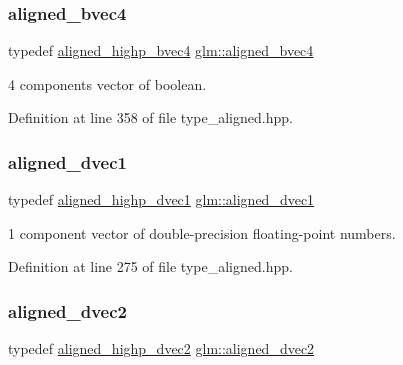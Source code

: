 \subsubsection{\texorpdfstring{aligned\_bvec4}{aligned\_bvec4}}
{\footnotesize\ttfamily typedef \mbox{\hyperlink{group__gtc__type__aligned_ga2e41bbaacd4df8babd91b4e2f21cb8dd}{aligned\+\_\+highp\+\_\+bvec4}} \mbox{\hyperlink{group__gtc__type__aligned_gaa62e46e15c76ced942cdeba89776c5f6}{glm\+::aligned\+\_\+bvec4}}}



4 components vector of boolean. 



Definition at line 358 of file type\+\_\+aligned.\+hpp.

\mbox{\label{group__gtc__type__aligned_ga81fe4410dc880770293c53fcba83c9e4}} 
\subsubsection{\texorpdfstring{aligned\_dvec1}{aligned\_dvec1}}
{\footnotesize\ttfamily typedef \mbox{\hyperlink{group__gtc__type__aligned_ga14f56809d9577d7f1c3c8fc77651c671}{aligned\+\_\+highp\+\_\+dvec1}} \mbox{\hyperlink{group__gtc__type__aligned_ga81fe4410dc880770293c53fcba83c9e4}{glm\+::aligned\+\_\+dvec1}}}



1 component vector of double-\/precision floating-\/point numbers. 



Definition at line 275 of file type\+\_\+aligned.\+hpp.

\mbox{\label{group__gtc__type__aligned_ga1e6972e837bc34b3424af8d63a71d7c6}} 
\subsubsection{\texorpdfstring{aligned\_dvec2}{aligned\_dvec2}}
{\footnotesize\ttfamily typedef \mbox{\hyperlink{group__gtc__type__aligned_gaaaaceecde7bb178eebc873836c7e6009}{aligned\+\_\+highp\+\_\+dvec2}} \mbox{\hyperlink{group__gtc__type__aligned_ga1e6972e837bc34b3424af8d63a71d7c6}{glm\+::aligned\+\_\+dvec2}}}



